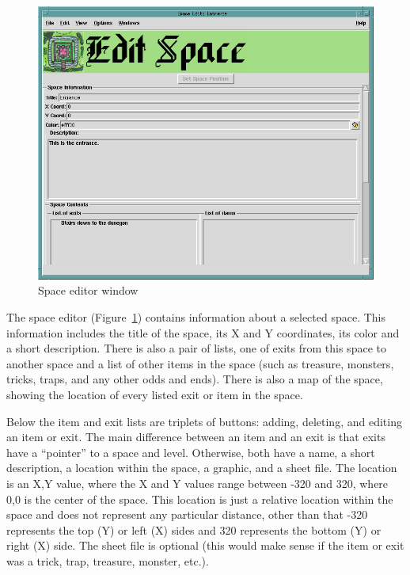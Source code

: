 \begin{figure}[hbpt] 
\begin{centering}
\includegraphics[width=5in]{SpaceEditor.png}
\caption{Space editor window}
\label{fig:SpaceEditor}
\end{centering}
\end{figure}
The space editor (Figure~\ref{fig:SpaceEditor}) contains information
about a selected space.  This information includes the title of the
space, its X and Y coordinates, its color and a short description. 
There is also a pair of lists, one of exits from this space to another
space and a list of other items in the space (such as treasure,
monsters, tricks, traps, and any other odds and ends).  There is also a
map of the space, showing the location of every listed exit or item in
the space.

Below the item and exit lists are triplets of buttons: adding,
deleting, and editing an item or exit.  The main difference between an
item and an exit is that exits have a ``pointer'' to a space and level.
Otherwise, both have a name, a short description, a location within
the space, a graphic, and a sheet file.  The location is an X,Y value,
where the  X and Y values range between -320 and 320, where 0,0 is the
center of the space.  This location is just a relative location within
the space and does not represent any particular distance, other than
that -320 represents the top (Y) or left (X) sides and 320 represents
the bottom (Y) or right (X) side.  The sheet file is optional (this
would make sense if the item or exit was a trick, trap, treasure,
monster, etc.).

